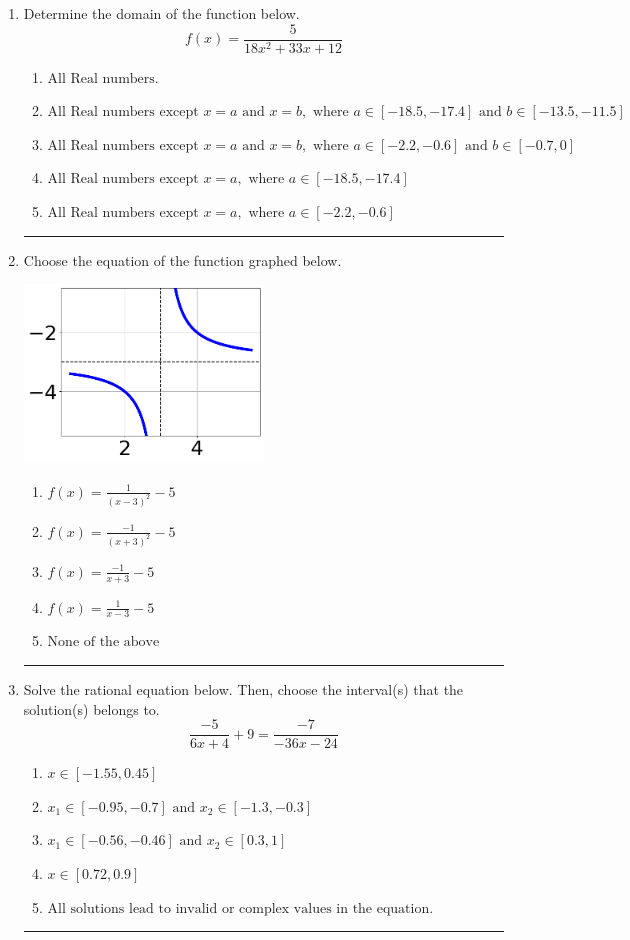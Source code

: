 \documentclass[14pt]{extbook}
\newcommand{\litem}[1]{\item#1\hspace*{-1cm}\rule{\textwidth}{0.4pt}}
\begin{document}
\begin{enumerate}
\litem{
Determine the domain of the function below.\[ f(x) = \frac{5}{18x^{2} +33 x + 12} \]\begin{enumerate}[label=\Alph*.]
\item \( \text{All Real numbers.} \)
\item \( \text{All Real numbers except } x = a \text{ and } x = b, \text{ where } a \in [-18.5, -17.4] \text{ and } b \in [-13.5, -11.5] \)
\item \( \text{All Real numbers except } x = a \text{ and } x = b, \text{ where } a \in [-2.2, -0.6] \text{ and } b \in [-0.7, 0] \)
\item \( \text{All Real numbers except } x = a, \text{ where } a \in [-18.5, -17.4] \)
\item \( \text{All Real numbers except } x = a, \text{ where } a \in [-2.2, -0.6] \)

\end{enumerate} }
\litem{
Choose the equation of the function graphed below.
\begin{center}
    \includegraphics[width=0.5\textwidth]{../Figures/rationalGraphToEquationCopyC.png}
\end{center}
\begin{enumerate}[label=\Alph*.]
\item \( f(x) = \frac{1}{(x - 3)^2} - 5 \)
\item \( f(x) = \frac{-1}{(x + 3)^2} - 5 \)
\item \( f(x) = \frac{-1}{x + 3} - 5 \)
\item \( f(x) = \frac{1}{x - 3} - 5 \)
\item \( \text{None of the above} \)

\end{enumerate} }
\litem{
Solve the rational equation below. Then, choose the interval(s) that the solution(s) belongs to.\[ \frac{-5}{6x + 4} + 9 = \frac{-7}{-36x -24} \]\begin{enumerate}[label=\Alph*.]
\item \( x \in [-1.55,0.45] \)
\item \( x_1 \in [-0.95, -0.7] \text{ and } x_2 \in [-1.3,-0.3] \)
\item \( x_1 \in [-0.56, -0.46] \text{ and } x_2 \in [0.3,1] \)
\item \( x \in [0.72,0.9] \)
\item \( \text{All solutions lead to invalid or complex values in the equation.} \)


\end{enumerate}}
\end{enumerate}
\end{document}
